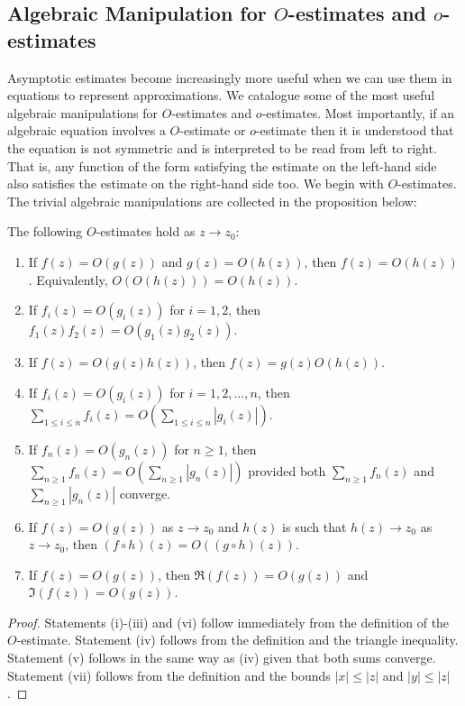       \subsection*{Algebraic Manipulation for \texorpdfstring{$O$}{O}-estimates and \texorpdfstring{$o$}{o}-estimates}
        Asymptotic estimates become increasingly more useful when we can use them in equations to represent approximations. We catalogue some of the most useful algebraic manipulations for $O$-estimates and $o$-estimates. Most importantly, if an algebraic equation involves a $O$-estimate or $o$-estimate then it is understood that the equation is not symmetric and is interpreted to be read from left to right. That is, any function of the form satisfying the estimate on the left-hand side also satisfies the estimate on the right-hand side too. We begin with $O$-estimates. The trivial algebraic manipulations are collected in the proposition below:

        \begin{proposition}\label{prop:Big_Oh_manipulations}
            The following $O$-estimates hold as $z \to z_{0}$:
            \begin{enumerate}[label=(\roman*)]
              \item If $f(z) = O(g(z))$ and $g(z) = O(h(z))$, then $f(z) = O(h(z))$. Equivalently, $O(O(h(z))) = O(h(z))$.
              \item If $f_{i}(z) = O(g_{i}(z))$ for $i = 1,2$, then $f_{1}(z)f_{2}(z) = O(g_{1}(z)g_{2}(z))$.
              \item If $f(z) = O(g(z)h(z))$, then $f(z) = g(z)O(h(z))$.
              \item If $f_{i}(z) = O(g_{i}(z))$ for $i = 1,2,\ldots,n$, then $\sum_{1 \le i \le n}f_{i}(z) = O\left(\sum_{1 \le i \le n}|g_{i}(z)|\right)$.
              \item If $f_{n}(z) = O(g_{n}(z))$ for $n \ge 1$, then $\sum_{n \ge 1}f_{n}(z) = O\left(\sum_{n \ge 1}|g_{n}(z)|\right)$ provided both $\sum_{n \ge 1}f_{n}(z)$ and $\sum_{n \ge 1}|g_{n}(z)|$ converge.
              \item If $f(z) = O(g(z))$ as $z \to z_{0}$ and $h(z)$ is such that $h(z) \to z_{0}$ as $z \to z_{0}$, then $(f \circ h)(z) = O((g \circ h)(z))$.
              \item If $f(z) = O(g(z))$, then $\Re(f(z)) = O(g(z))$ and $\Im(f(z)) = O(g(z))$.
            \end{enumerate}
        \end{proposition}
        \begin{proof}
          Statements (i)-(iii) and (vi) follow immediately from the definition of the $O$-estimate. Statement (iv) follows from the definition and the triangle inequality. Statement (v) follows in the same way as (iv) given that both sums converge. Statement (vii) follows from the definition and the bounds $|x| \le |z|$ and $|y| \le |z|$.
        \end{proof}

